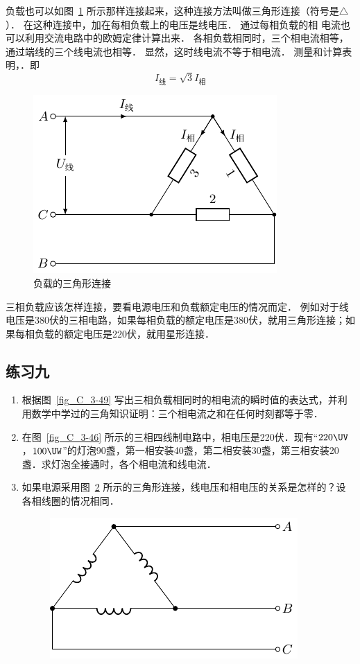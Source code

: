 负载也可以如图~\ref{fig_C_3-52} 所示那样连接起来，这种连接方法叫做三角形连接（符号是$\triangle$）．
在这种连接中，加在每相负载上的电压是线电压．
通过每相负载的相
电流也可以利用交流电路中的欧姆定律计算出来．
各相负载相同时，三个相电流相等，通过端线的三个线电流也相等．
显然，这时线电流不等于相电流．
测量和计算表明，．即
\[I_{\text{线}}=\sqrt{3}I_{\text{相}}\]
\begin{figure}[htbp]
    \centering
    \includegraphics{fig/C/3-52.pdf}
    \caption{负载的三角形连接}\label{fig_C_3-52}
\end{figure}

三相负载应该怎样连接，要看电源电压和负载额定电压的情况而定．
例如对于线电压是380伏的三相电路，如果每相负载的额定电压是380伏，就用三角形连接；如果每相负载的额定电压是220伏，就用星形连接．

\subsection*{练习九}
\begin{enumerate}
    \item 根据图~\ref{fig_C_3-49} 写出三相负载相同时的相电流的瞬时值的表达式，并利用数学中学过的三角知识证明：三个相电流之和在任何时刻都等于零．
    \item 在图~\ref{fig_C_3-46} 所示的三相四线制电路中，相电压是220伏．现有“$220\UV $，$ 100\UW$”的灯泡90盏，第一相安装40盏，第二相安装30盏，第三相安装20盏．求灯泡全接通时，各个相电流和线电流．
    \item 如果电源采用图~\ref{fig_C_3-53} 所示的三角形连接，线电压和相电压的关系是怎样的？设各相线圈的情况相同．
    \begin{figure}[htbp]
    	\centering
    	\includegraphics{fig/C/3-53.pdf}
    	\caption{}\label{fig_C_3-53}
    \end{figure}
\end{enumerate}



